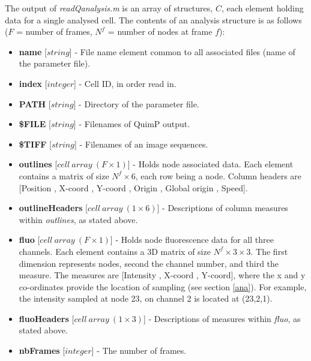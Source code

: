 \documentclass[a4paper,12pt]{article}
\begin{document}
The output of \textit{readQanalysis.m} is an array of structures, $C$, each element holding data for a single analysed cell.
The contents of an analysis structure is as follows ($F$ = number of frames, $N^{f}$ = number of nodes at frame $f$):

\begin{itemize}

 \item \textbf{name} [$string$] - File name element common to all associated files (name of the parameter file).
 
  \item \textbf{index} [$integer$] - Cell ID, in order read in.
 
 \item \textbf{PATH} [$string$] - Directory of the parameter file.
 
 \item \textbf{\$FILE} [$string$] - Filenames of  QuimP output.
 
 \item \textbf{\$TIFF} [$string$] - Filenames of an image sequences.
 
  \item \textbf{outlines} [$cell~array~(F\times1)$]  - Holds node associated data. Each element
 contains a matrix of size $N^{f}\times6$,
each row being a node. Column headers are [Position , X-coord , Y-coord , Origin , Global origin ,  Speed].
 
 \item \textbf{outlineHeaders} [$cell~array~(1\times6)$] - Descriptions of column measures within \textit{outlines},
  as stated above.
  
 \item \textbf{fluo} [$cell~array~(F\times1)$] - Holds node fluorescence data for all three channels. Each element contains a 
  3D matrix of size $N^{f}\times3\times3$.  The first dimension represents nodes, second the channel number, and third the
  measure.   The measures are [Intensity , X-coord , Y-coord], where the x and y co-ordinates provide the location of
  sampling (see section \ref{ana}).  For example, the intensity sampled at node 23, on channel 2 is located at (23,2,1).
  
 \item \textbf{fluoHeaders} [$cell~array~(1\times3)$] - Descriptions of measures within \textit{fluo}, as 
 stated above.
 
 \item \textbf{nbFrames} [$integer$] - The number of frames.


\end{itemize}
\end{document}
